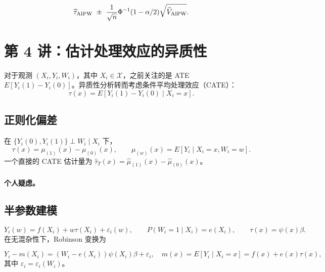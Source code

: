 \[
\widehat\tau_{\rm AIPW}\ \pm\ \frac1{\sqrt n}\Phi^{-1}(1-\alpha/2)\sqrt{\widehat V_{\rm AIPW}}.
\]

\section{第 4 讲：估计处理效应的异质性}
对于观测 $(X_i,Y_i,W_i)$，其中 $X_i\in\mathcal X$，之前关注的是 ATE $E[Y_i(1)-Y_i(0)]$。异质性分析转而考虑条件平均处理效应（CATE）：
\[
\tau(x)=E[Y_i(1)-Y_i(0)\mid X_i=x].
\]
\subsection{正则化偏差}
在 $\{Y_i(0),Y_i(1)\}\perp W_i\mid X_i$ 下，
\[
\tau(x)=\mu_{(1)}(x)-\mu_{(0)}(x),\qquad
\mu_{(w)}(x)=E[Y_i\mid X_i=x,W_i=w].
\]
一个直接的 CATE 估计量为 $\widehat\tau_T(x)=\widehat\mu_{(1)}(x)-\widehat\mu_{(0)}(x)$。
\paragraph{个人疑虑。}
\subsection{半参数建模}
\[
Y_i(w)=f(X_i)+w\tau(X_i)+\varepsilon_i(w),\qquad
P(W_i=1\mid X_i)=e(X_i),\qquad \tau(x)=\psi(x)\beta.
\]
在无混杂性下，Robinson 变换为

\[
Y_i-m(X_i)=(W_i-e(X_i))\psi(X_i)\beta+\varepsilon_i,
\quad m(x)=E[Y_i\mid X_i=x]=f(x)+e(x)\tau(x),
\]
其中 $\varepsilon_i=\varepsilon_i(W_i)$。

